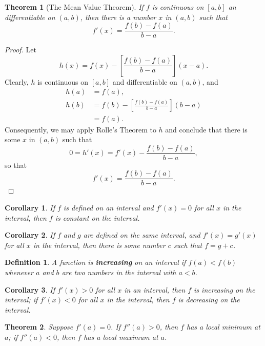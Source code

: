 \documentclass{article}
\newtheorem{corollary}{Corollary}
\numberwithin{corollary}{subsection}
\newtheorem{definition}{Definition}
\numberwithin{definition}{subsection}
\numberwithin{lemma}{subsection}
\newtheorem{theorem}{Theorem}
\numberwithin{theorem}{subsection}
\begin{document}
\begin{theorem}[The Mean Value Theorem]
  If $f$ is continuous on $[a, b]$ an differentiable on $(a, b)$, then there is
  a number $x$ in $(a, b)$ such that \[
    f'(x) = \frac{f(b) - f(a)}{b - a}.
  \]
\end{theorem}
\begin{proof}
  Let \[
    h(x) = f(x) - \left[\frac{f(b) - f(a)}{b - a}\right](x - a).
  \] Clearly, $h$ is continuous on $[a, b]$ and differentiable on $(a, b)$, and
  \begin{align*}
    h(a) &= f(a), \\
    h(b) &= f(b) - \left[\frac{f(b) - f(a)}{b - a}\right](b - a) \\
         &= f(a).
  \end{align*}
  Consequently, we may apply Rolle's Theorem to $h$ and conclude that there is
  some $x$ in $(a, b)$ such that \[
    0 = h'(x) = f'(x) - \frac{f(b) - f(a)}{b - a},
  \] so that \[
    f'(x) = \frac{f(b) - f(a)}{b - a}.
  \]
\end{proof}

\begin{corollary}
  If $f$ is defined on an interval and $f'(x) = 0$ for all $x$ in the interval,
  then $f$ is constant on the interval.
\end{corollary}

\begin{corollary}
  If $f$ and $g$ are defined on the same interval, and $f'(x) = g'(x)$ for all
  $x$ in the interval, then there is some number $c$ such that $f = g + c$.
\end{corollary}

\begin{definition}
  A function is \textbf{increasing} on an interval if $f(a) < f(b)$ whenever $a$
  and $b$ are two numbers in the interval with $a < b$.
\end{definition}

\begin{corollary}
  If $f'(x) > 0$ for all $x$ in an interval, then $f$ is increasing on the
  interval; if $f'(x) < 0$ for all $x$ in the interval, then $f$ is decreasing
  on the interval.
\end{corollary}

\begin{theorem}
  Suppose $f'(a) = 0$. If $f''(a) > 0$, then $f$ has a local minimum at $a$; if
  $f''(a) < 0$, then $f$ has a local maximum at $a$.
\end{theorem}
\end{document}
